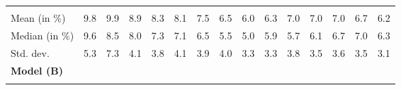 \begin{tabular}{lllllllllllllll}
  \multicolumn{1}{|r}{} &
  \multicolumn{1}{r}{} &
  \multicolumn{1}{r}{} &
  \multicolumn{1}{r}{} &
  \multicolumn{1}{r}{} &
  \multicolumn{1}{r}{} &
  \multicolumn{1}{r}{} &
  \multicolumn{1}{r}{} &
  \multicolumn{1}{r}{} &
  \multicolumn{1}{r}{} &
  \multicolumn{1}{r}{} &
  \multicolumn{1}{r}{} &
  \multicolumn{1}{r}{} &
  \multicolumn{1}{r}{} \\
\multicolumn{1}{l}{\hspace{2em}Mean (in $\%$)} &
  \multicolumn{1}{|r}{9.8} &
  \multicolumn{1}{r}{9.9} &
  \multicolumn{1}{r}{8.9} &
  \multicolumn{1}{r}{8.3} &
  \multicolumn{1}{r}{8.1} &
  \multicolumn{1}{r}{7.5} &
  \multicolumn{1}{r}{6.5} &
  \multicolumn{1}{r}{6.0} &
  \multicolumn{1}{r}{6.3} &
  \multicolumn{1}{r}{7.0} &
  \multicolumn{1}{r}{7.0} &
  \multicolumn{1}{r}{7.0} &
  \multicolumn{1}{r}{6.7} &
  \multicolumn{1}{r}{6.2} \\
\multicolumn{1}{l}{\hspace{2em}Median (in $\%$)} &
  \multicolumn{1}{|r}{9.6} &
  \multicolumn{1}{r}{8.5} &
  \multicolumn{1}{r}{8.0} &
  \multicolumn{1}{r}{7.3} &
  \multicolumn{1}{r}{7.1} &
  \multicolumn{1}{r}{6.5} &
  \multicolumn{1}{r}{5.5} &
  \multicolumn{1}{r}{5.0} &
  \multicolumn{1}{r}{5.9} &
  \multicolumn{1}{r}{5.7} &
  \multicolumn{1}{r}{6.1} &
  \multicolumn{1}{r}{6.7} &
  \multicolumn{1}{r}{7.0} &
  \multicolumn{1}{r}{6.3} \\
\multicolumn{1}{l}{\hspace{2em}Std. dev.} &
  \multicolumn{1}{|r}{5.3} &
  \multicolumn{1}{r}{7.3} &
  \multicolumn{1}{r}{4.1} &
  \multicolumn{1}{r}{3.8} &
  \multicolumn{1}{r}{4.1} &
  \multicolumn{1}{r}{3.9} &
  \multicolumn{1}{r}{4.0} &
  \multicolumn{1}{r}{3.3} &
  \multicolumn{1}{r}{3.3} &
  \multicolumn{1}{r}{3.8} &
  \multicolumn{1}{r}{3.5} &
  \multicolumn{1}{r}{3.6} &
  \multicolumn{1}{r}{3.5} &
  \multicolumn{1}{r}{3.1} \\
\multicolumn{1}{l}{{\textbf{Model (B)}}} &
  \multicolumn{1}{|r}{} &
  \multicolumn{1}{r}{} &
  \multicolumn{1}{r}{} &
  \multicolumn{1}{r}{} &
  \multicolumn{1}{r}{} &
  \multicolumn{1}{r}{} &
  \multicolumn{1}{r}{} &
  \multicolumn{1}{r}{} &
  \multicolumn{1}{r}{} &
  \multicolumn{1}{r}{} &
  \multicolumn{1}{r}{} &
  \multicolumn{1}{r}{} &
  \multicolumn{1}{r}{} &
  \multicolumn{1}{r}{} \\
\multicolumn{1}{l}{\hspace{1em}{\textit{Mult. term} ($\widehat{\tau}^{adv}$)}} &
  \multicolumn{1}{|r}{} &
  \multicolumn{1}{r}{} &
  \multicolumn{1}{r}{} &
  \multicolumn{1}{r}{} &

\end{tabular}

